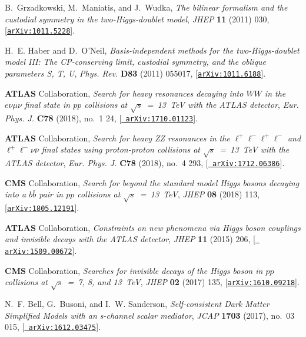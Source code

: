 \documentclass[a4paper, 11pt,notoc]{article}
\begin{document}
\begin{thebibliography}{100}
B.~Grzadkowski, M.~Maniatis, and J.~Wudka, {\it {The bilinear formalism and the
  custodial symmetry in the two-Higgs-doublet model}},  {\em JHEP} {\bf 11}
  (2011) 030, [\href{http://arxiv.org/abs/1011.5228}{{\tt arXiv:1011.5228}}].

H.~E. Haber and D.~O'Neil, {\it {Basis-independent methods for the
  two-Higgs-doublet model III: The CP-conserving limit, custodial symmetry, and
  the oblique parameters S, T, U}},  {\em Phys. Rev.} {\bf D83} (2011) 055017,
  [\href{http://arxiv.org/abs/1011.6188}{{\tt arXiv:1011.6188}}].

{\bf ATLAS} Collaboration, {\it {Search for heavy resonances
  decaying into $WW$ in the $e\nu\mu\nu$ final state in $pp$ collisions at
  $\sqrt{s}$~=~13~TeV with the ATLAS detector}},  {\em Eur. Phys. J.} {\bf C78}
  (2018), no.~1 24, [\href{http://arxiv.org/abs/1710.01123}{{\tt
  arXiv:1710.01123}}].

{\bf ATLAS} Collaboration, {\it {Search for heavy ZZ
  resonances in the $\ell ^+\ell ^-\ell ^+\ell ^-$ and $\ell ^+\ell ^-\nu
  \bar{\nu }$ final states using proton-proton collisions at $\sqrt{s}$~=~13~TeV 
  with the ATLAS detector}},  {\em Eur. Phys. J.} {\bf C78}
  (2018), no.~4 293, [\href{http://arxiv.org/abs/1712.06386}{{\tt
  arXiv:1712.06386}}].

{\bf CMS} Collaboration, {\it {Search for beyond the
  standard model Higgs bosons decaying into a $b \bar b$ pair in
  $pp$ collisions at $\sqrt{s}$~=~13~TeV}},  {\em JHEP} {\bf 08} (2018) 113,
  [\href{http://arxiv.org/abs/1805.12191}{{\tt arXiv:1805.12191}}].

{\bf ATLAS} Collaboration, {\it {Constraints on new phenomena
  via Higgs boson couplings and invisible decays with the ATLAS detector}},
  {\em JHEP} {\bf 11} (2015) 206, [\href{http://arxiv.org/abs/1509.00672}{{\tt
  arXiv:1509.00672}}].

{\bf CMS} Collaboration, {\it {Searches for invisible
  decays of the Higgs boson in $pp$ collisions at $\sqrt{s}$~=~7, 8, and 13~TeV}},  
  {\em JHEP} {\bf 02} (2017) 135,
  [\href{http://arxiv.org/abs/1610.09218}{{\tt arXiv:1610.09218}}].

N.~F. Bell, G.~Busoni, and I.~W. Sanderson, {\it {Self-consistent Dark Matter
  Simplified Models with an s-channel scalar mediator}},  {\em JCAP} {\bf 1703}
  (2017), no.~03 015, [\href{http://arxiv.org/abs/1612.03475}{{\tt
  arXiv:1612.03475}}].


\end{thebibliography}
\end{document}
